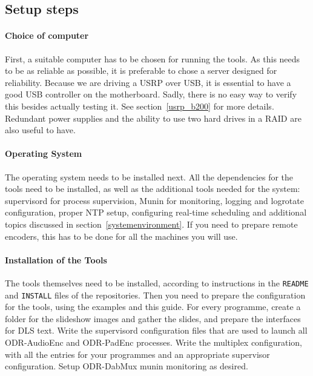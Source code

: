 \subsection{Setup steps}
\paragraph{Choice of computer}
First, a suitable computer has to be chosen for running the tools. As this needs
to be as reliable as possible, it is preferable to chose a server designed for
reliability. Because we are driving a USRP over USB, it is essential to have a
good USB controller on the motherboard. Sadly, there is no easy way to verify
this besides actually testing it. See section~\ref{usrp_b200} for more details.
Redundant power supplies and the ability to use two hard drives in a RAID are
also useful to have.

\paragraph{Operating System}
The operating system needs to be installed next. All the dependencies for the
tools need to be installed, as well as the additional tools needed for the
system: supervisord for process supervision, Munin for monitoring, logging and
logrotate configuration, proper NTP setup, configuring real-time scheduling and
additional topics discussed in section~\ref{systemenvironment}.
If you need to prepare remote encoders, this has to be done for all the machines
you will use.

\paragraph{Installation of the Tools}
The tools themselves need to be installed, according to instructions in the
\texttt{README} and \texttt{INSTALL} files of the repositories. Then you need to
prepare the configuration for the tools, using the examples and this guide.
For every programme, create a folder for the slideshow images and gather the
slides, and prepare the interfaces for DLS text.
Write the supervisord configuration files that are used to launch all
ODR-AudioEnc and ODR-PadEnc processes. Write the multiplex configuration, with
all the entries for your programmes and an appropriate supervisor configuration.
Setup ODR-DabMux munin monitoring as desired.

